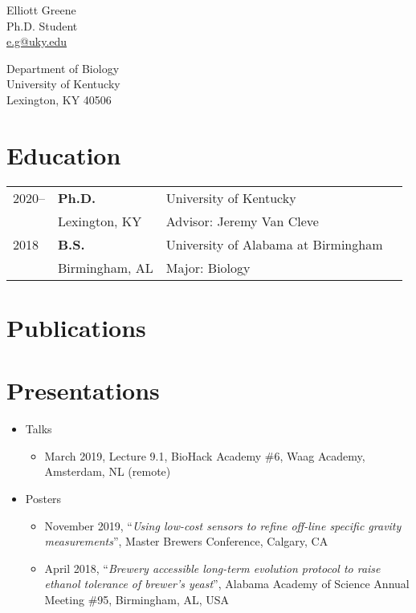 \documentclass[11pt]{article}
\begin{document}
\thispagestyle{plain}
\begin{minipage}[t]{1.00in}    \centering
    Elliott Greene \\
    Ph.D. Student \\
    {\href{mailto:e.g@uky.edu}{e.g@uky.edu}}

\end{minipage}
    \begin{minipage}[t]{3.0in} \centering
        Department of Biology \\
        University of Kentucky \\
        Lexington, KY 40506
    \end{minipage}


    \section*{Education}
        \begin{tabular}{@{}p{1.0in}@{}p{2.0in}@{}p{3in}r}
            2020-- & \textbf{Ph.D.} & University of Kentucky \\
            & Lexington, KY & Advisor: Jeremy Van Cleve \\
            2018 & \textbf{B.S.} & University of Alabama at Birmingham\\
            & Birmingham, AL  & Major: Biology
        \end{tabular}


        
    \section*{Publications}

    \section*{Presentations}
        \begin{itemize}[leftmargin=.25in]
            \item Talks
                \begin{itemize}
                    \item March 2019, Lecture 9.1, BioHack Academy \#6, Waag Academy, Amsterdam, NL (remote)
                \end{itemize}
            \item Posters
                \begin{itemize}
                    \item November 2019, “{\it Using low-cost sensors to refine off-line specific gravity measurements}”, Master Brewers Conference, Calgary, CA
                    \item April 2018, “{\it Brewery accessible long-term evolution protocol to raise ethanol tolerance of brewer’s yeast}”, Alabama Academy of Science Annual Meeting \#95, Birmingham, AL, USA
                \end{itemize}
        \end{itemize}
\end{document}
